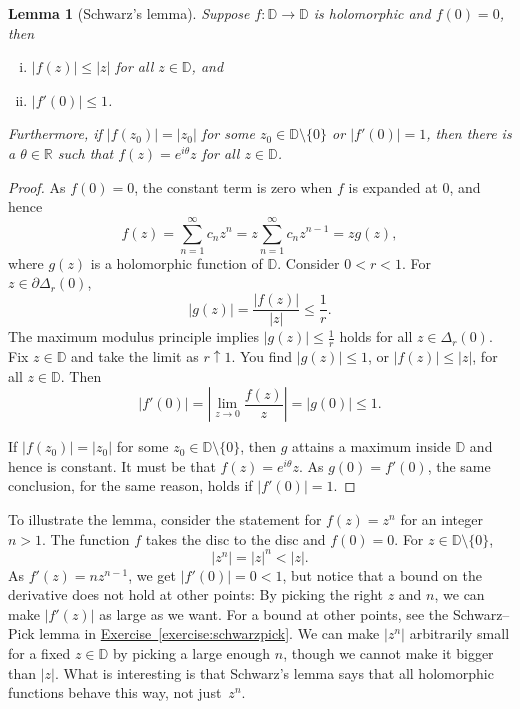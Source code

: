 \documentclass[12pt,openany]{book}
\newcommand{\sabs}[1]{\lvert {#1} \rvert}
\newcommand{\abs}[1]{\left\lvert {#1} \right\rvert}
\newcommand{\R}{{\mathbb{R}}}
\newcommand{\D}{{\mathbb{D}}}
\theoremstyle{plain}
\newtheorem{lemma}[thm]{Lemma}
\theoremstyle{remark}
\theoremstyle{definition}
\theoremstyle{exercise}
\theoremstyle{example}
\newcommand{\exerciseref}[1]{\hyperref[#1]{Exercise~\ref*{#1}}}
\begin{document}
\begin{lemma}[Schwarz's lemma]\label{lemma:schwarz}
Suppose $f \colon \D \to \D$ is holomorphic and $f(0) = 0$,
then 
\begin{enumerate}[(i)]
\item $\sabs{f(z)} \leq \sabs{z}$ for all $z \in \D$, and
\item $\sabs{f'(0)} \leq 1$.
\end{enumerate}
Furthermore, if $\sabs{f(z_0)} = \sabs{z_0}$ for some $z_0 \in \D \setminus
\{ 0 \}$
or $\sabs{f'(0)} = 1$, then
there is a $\theta \in \R$ such that $f(z) =
e^{i\theta} z$ for all $z \in \D$.
\end{lemma}

\begin{proof}
As $f(0) = 0$, the constant term is zero when $f$ is expanded at $0$, and hence
\begin{equation*}
f(z) = \sum_{n=1}^\infty c_n z^n = z \sum_{n=1}^\infty c_n z^{n-1} = z g(z) ,
\end{equation*}
where $g(z)$ is a holomorphic function of $\D$.
Consider $0 < r < 1$.
For $z \in \partial \Delta_r(0)$,
\begin{equation*}
\sabs{g(z)} = \frac{\sabs{f(z)}}{\sabs{z}} \leq \frac{1}{r}  .
\end{equation*}
The maximum modulus principle implies $\sabs{g(z)} \leq \frac{1}{r}$
holds for all $z \in \Delta_r(0)$.
Fix $z \in \D$ and take the limit as $r \uparrow 1$. 
You find
$\sabs{g(z)} \leq 1$,
or
$\sabs{f(z)} \leq \sabs{z}$,
for all $z \in \D$.  Then
\begin{equation*}
\abs{f'(0)}
=
\abs{\lim_{z \to 0} \frac{f(z)}{z}} = \sabs{g(0)} \leq 1 .
\end{equation*}

If $\sabs{f(z_0)} = \sabs{z_0}$ for some $z_0 \in \D \setminus \{ 0 \}$,
then $g$ attains a maximum inside $\D$ and hence is constant.
It must be that $f(z) = e^{i \theta} z$.
As $g(0) = f'(0)$, the same conclusion, for the same reason,
holds if $\sabs{f'(0)} = 1$.
\end{proof}

To illustrate the lemma, consider the statement for $f(z) = z^n$
for an integer $n > 1$.  The function $f$ takes the disc to the disc
and $f(0) = 0$.  For $z \in \D \setminus \{ 0 \}$,
\begin{equation*}
\sabs{z^n} =
\sabs{z}^n < \sabs{z} .
\end{equation*}
As $f'(z) = n z^{n-1}$, we get
$\sabs{f'(0)} = 0 < 1$, but notice that a bound on the derivative
does not hold at other points:
By picking the right $z$ and $n$,
we can make $\sabs{f'(z)}$ as large as we want.
For a bound at other points, see the Schwarz--Pick lemma in
\exerciseref{exercise:schwarzpick}.
We can make $\sabs{z^n}$ arbitrarily small for a fixed $z \in \D$ by picking
a large enough $n$, though we cannot make it bigger than $\sabs{z}$.  What is
interesting is that Schwarz's lemma says that all holomorphic functions
behave this way, not just~$z^n$.
\end{document}
